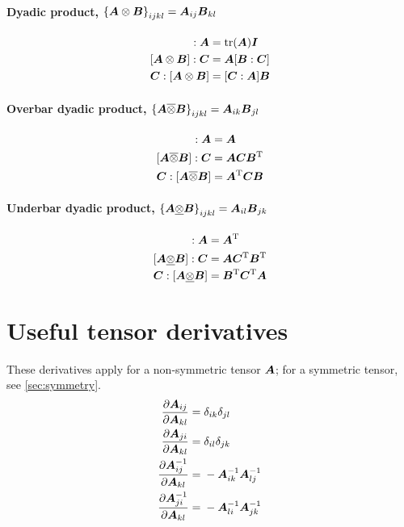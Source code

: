 \documentclass[10pt,letterpaper,oneside]{report}
\newcommand{\ten}[1]{\mbox{\boldmath $#1$}{}}
\newcommand{\scas}[1]{\mbox{{\scriptsize{${\rm{#1}}$}}}{}}
\begin{document}
\paragraph{Dyadic product, $\left\lbrace \ten{A} \otimes \ten{B} \right\rbrace _{ijkl} = \ten{A}_{ij} \ten{B}_{kl} $}
\begin{align}
[\ten{I} \otimes \ten{I} ] : \ten{A} &= \text{tr} (\ten{A}) \ten{I} 
\\
[\ten{A} \otimes \ten{B}] : \ten{C} &= \ten{A} [\ten{B}:\ten{C}] 
\\
\ten{C}:[\ten{A} \otimes \ten{B}] &= [\ten{C}:\ten{A}] \ten{B} 
\end{align}

\paragraph{Overbar dyadic product, $\left\lbrace \ten{A} \overline{\otimes} \ten{B} \right\rbrace _{ijkl} = \ten{A}_{ik} \ten{B}_{jl}$}
\begin{align}
[\ten{I} \overline{\otimes} \ten{I} ] : \ten{A} &= \ten{A}  
\\
[\ten{A} \overline{\otimes} \ten{B}] : \ten{C} &= \ten{A} \ten{C} \ten{B}^{\scas{T}} 
\\
\ten{C}:[\ten{A} \overline{\otimes} \ten{B}] &= \ten{A}^{\scas{T}} \ten{C} \ten{B} 
\end{align}

\paragraph{Underbar dyadic product, $\left\lbrace \ten{A} \underline{\otimes} \ten{B} \right\rbrace _{ijkl} = \ten{A}_{il} \ten{B}_{jk}$}
\begin{align}
[\ten{I} \underline{\otimes} \ten{I} ] : \ten{A} &= \ten{A}^{\scas{T}}  
\\
[\ten{A} \underline{\otimes} \ten{B}] : \ten{C} &= \ten{A}\ten{C}^{\scas{T}} \ten{B}^{\scas{T}} 
\\
\ten{C}:[ \ten{A} \underline{\otimes} \ten{B}] &= \ten{B}^{\scas{T}} \ten{C}^{\scas{T}} \ten{A}
\end{align}


\section{Useful tensor derivatives}
These derivatives apply for a non-symmetric tensor $\ten{A}$; for a symmetric tensor, see \autoref{sec:symmetry}.
\begin{align}
\frac{\partial \ten{A}_{ij}}{\partial \ten{A}_{kl}} ={}& \delta_{ik} \delta_{jl}
\\
\frac{\partial \ten{A}_{ji}}{\partial \ten{A}_{kl}} ={}& \delta_{il} \delta_{jk}
\\
\frac{\partial \ten{A}^{-1}_{ij}}{\partial \ten{A}_{kl}} ={}& - \ten{A}^{-1}_{ik} \ten{A}^{-1}_{lj}
\\
\frac{\partial \ten{A}^{-1}_{ji}}{\partial \ten{A}_{kl}} ={}& - \ten{A}^{-1}_{li} \ten{A}^{-1}_{jk}
\end{align}
\end{document}
